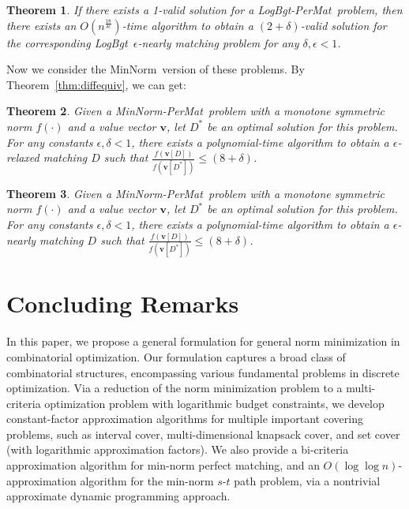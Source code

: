 \documentclass[11pt,a4paper]{article} \usepackage{enumitem}
\newcommand{\assigned}[1]{[ #1 ]}
\newcommand{\boldv}{\boldsymbol{v}}
\newcommand{\minnorm}{\textsf{MinNorm}}
\newcommand{\LBO}{\textsf{LogBgt}}
\newcommand{\minnormmatch}{\textsf{MinNorm-PerMat}}
\newcommand{\LBOmatch}{\textsf{LogBgt-PerMat}}
\newtheorem{theorem}{Theorem}[section]
\theoremstyle{definition}
\begin{document}
\begin{theorem} \label{thm:matching-i3}
If there exists a 1-valid solution for a \LBOmatch\ problem, then there exists an $O(n^{\frac{18}{\delta\epsilon}})$-time algorithm to obtain a $(2+\delta)$-valid solution for the corresponding \LBO\ $\epsilon$-nearly matching problem for any $\delta,\epsilon<1$.
\end{theorem}

Now we consider the \minnorm\ version of these problems. By Theorem~\ref{thm:diffequiv}, we can get:

\begin{theorem}
\label{thm:normrelaxmatching}
Given a \minnormmatch\ problem with a monotone symmetric 
norm $f(\cdot)$ and a value vector $\boldv$, let $D^{*}$ be an optimal solution for this problem.
For any constants $\epsilon,\delta<1$, there exists a polynomial-time algorithm to obtain a $\epsilon$-relaxed matching $D$ such that $\frac{f(\boldv\assigned{D})}{f(\boldv\assigned{D^{*}})}\leq (8+\delta)$.
\end{theorem}

\begin{theorem}
\label{matching-i5}
Given a \minnormmatch\ problem with a monotone symmetric 
norm $f(\cdot)$ and a value vector $\boldv$, let $D^{*}$ be an optimal solution for this problem.
For any constants $\epsilon,\delta<1$, there exists a polynomial-time algorithm to obtain a $\epsilon$-nearly matching $D$ such that $\frac{f(\boldv\assigned{D})}{f(\boldv\assigned{D^{*}})}\leq (8+\delta)$.
\end{theorem}
 \section{Concluding Remarks}

In this paper, we propose a general formulation for general norm minimization in combinatorial optimization. Our formulation captures a broad class of combinatorial structures, encompassing various fundamental problems in discrete optimization. Via a reduction of the norm minimization problem to a multi-criteria optimization problem with logarithmic budget constraints, we develop constant-factor approximation algorithms for multiple important covering problems, such as interval cover, multi-dimensional knapsack cover, and set cover (with logarithmic approximation factors). We also provide a bi-criteria approximation algorithm for min-norm perfect matching, and an $O(\log\log n)$-approximation algorithm
for the min-norm $s$-$t$ path problem, via a nontrivial approximate dynamic programming approach.
\end{document}
